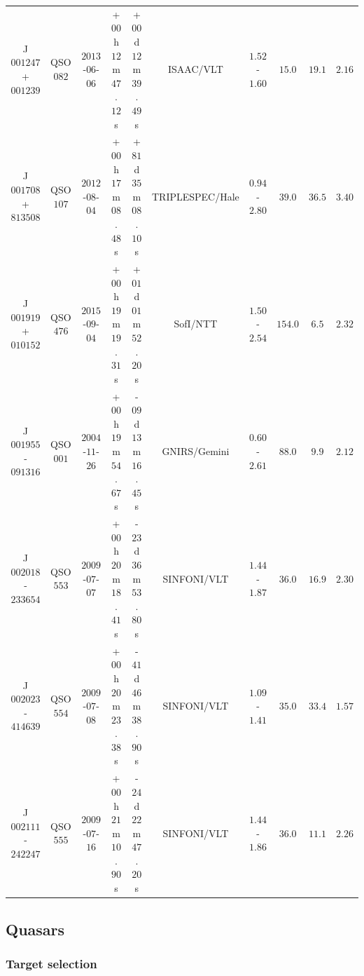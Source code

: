 \begin{landscape}
\begin{minipage}{\linewidth}
\begin{tabular}{cccccccccc}
    J$001247$+$001239$  &  QSO$082$ & $2013$-$06$-$06$ &  +$00$h$12$m$47$.$12$s &  +$00$d$12$m$39$.$49$s &        ISAAC/VLT &  $1.52$-$1.60$ &      $15.0$ &  $19.1$ &  $2.16$ \\
    J$001708$+$813508$  &  QSO$107$ & $2012$-$08$-$04$ &  +$00$h$17$m$08$.$48$s &  +$81$d$35$m$08$.$10$s &  TRIPLESPEC/Hale &  $0.94$-$2.80$ &      $39.0$ &  $36.5$ &  $3.40$ \\
    J$001919$+$010152$  &  QSO$476$ & $2015$-$09$-$04$ &  +$00$h$19$m$19$.$31$s &  +$01$d$01$m$52$.$20$s &         SofI/NTT &  $1.50$-$2.54$ &     $154.0$ &   $6.5$ &  $2.32$ \\
    J$001955$-$091316$  &  QSO$001$ & $2004$-$11$-$26$ &  +$00$h$19$m$54$.$67$s &  -$09$d$13$m$16$.$45$s &     GNIRS/Gemini &  $0.60$-$2.61$ &      $88.0$ &   $9.9$ &  $2.12$ \\
    J$002018$-$233654$  &  QSO$553$ & $2009$-$07$-$07$ &  +$00$h$20$m$18$.$41$s &  -$23$d$36$m$53$.$80$s &      SINFONI/VLT &  $1.44$-$1.87$ &      $36.0$ &  $16.9$ &  $2.30$ \\
    J$002023$-$414639$  &  QSO$554$ & $2009$-$07$-$08$ &  +$00$h$20$m$23$.$38$s &  -$41$d$46$m$38$.$90$s &      SINFONI/VLT &  $1.09$-$1.41$ &      $35.0$ &  $33.4$ &  $1.57$ \\
    J$002111$-$242247$  &  QSO$555$ & $2009$-$07$-$16$ &  +$00$h$21$m$10$.$90$s &  -$24$d$22$m$47$.$20$s &      SINFONI/VLT &  $1.44$-$1.86$ &      $36.0$ &  $11.1$ &  $2.26$ \\
    \bottomrule
    \end{tabular}
    \end{minipage}
\end{landscape}

\subsection{\citet{coatman16} Quasars}

\subsubsection{Target selection}

